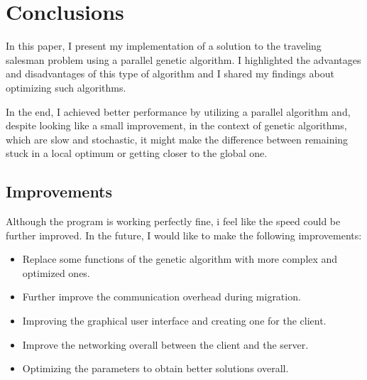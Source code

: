 \chapter*{Conclusions} 

In this paper, I present my implementation of a solution to the traveling salesman problem using a parallel genetic algorithm. I highlighted the advantages and disadvantages of this type of algorithm and I shared my findings about optimizing such algorithms.
\par
In the end, I achieved better performance by utilizing a parallel algorithm and, despite looking like a small improvement, in the context of genetic algorithms, which are slow and stochastic, it might make the difference between remaining stuck in a local optimum or getting closer to the global one.

\section*{Improvements}

Although the program is working perfectly fine, i feel like the speed could be further improved. In the future, I would like to make the following improvements:
\begin{itemize}
    \item Replace some functions of the genetic algorithm with more complex and optimized ones.
    \item Further improve the communication overhead during migration.
    \item Improving the graphical user interface and creating one for the client.
    \item Improve the networking overall between the client and the server.
    \item Optimizing the parameters to obtain better solutions overall.
\end{itemize}
